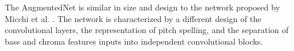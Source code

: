 
The AugmentedNet is similar in size and design to the network proposed by Micchi et al. \parencite{micchi2020not}. The network is characterized by a different design of the convolutional layers, the representation of pitch spelling, and the separation of bass and chroma features inputs into independent convolutional blocks.
